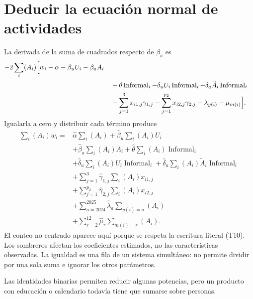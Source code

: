 \documentclass[11pt,a4paper]{article}
\begin{document}
\section{Deducir la ecuación normal de actividades}
La derivada de la suma de cuadrados respecto de $\beta_a$ es
\[
\begin{aligned}-2\sum_i(A_i)\Bigl[w_i-\alpha-\beta_uU_i-\beta_aA_i\\&\quad-\theta\operatorname{Informal}_i-\delta_uU_i\operatorname{Informal}_i-\delta_a\widetilde A_i\operatorname{Informal}_i\\&\quad-\sum_{j=1}^3x_{i1,j}\gamma_{1,j}-\sum_{j=1}^{p_2}x_{i2,j}\gamma_{2,j}-\lambda_{y(i)}-\mu_{m(i)}\Bigr].\end{aligned}
\]
Igualarla a cero y distribuir cada término produce
\[
\begin{aligned}
\sum_i(A_i)w_i={}&\widehat\alpha\sum_i(A_i)
+\widehat\beta_u\sum_i(A_i)U_i\\
&+\widehat\beta_a\sum_i(A_i)A_i
+\widehat\theta\sum_i(A_i)\operatorname{Informal}_i\\
&+\widehat\delta_u\sum_i(A_i)U_i\operatorname{Informal}_i
+\widehat\delta_a\sum_i(A_i)\widetilde A_i\operatorname{Informal}_i\\
&+\sum_{j=1}^3\widehat\gamma_{1,j}\sum_i(A_i)x_{i1,j}\\
&+\sum_{j=1}^{p_2}\widehat\gamma_{2,j}\sum_i(A_i)x_{i2,j}\\
&+\sum_{a=2024}^{2025}\widehat\lambda_a\sum_{y(i)=a}(A_i)\\
&+\sum_{r=2}^{12}\widehat\mu_r\sum_{m(i)=r}(A_i).\end{aligned}
\]
El conteo no centrado aparece aquí porque se respeta la escritura literal (T10).
Los sombreros afectan los coeficientes estimados, no las características observadas. La igualdad es una fila de un sistema simultáneo: no permite dividir por una sola suma e ignorar los otros parámetros.

Las identidades binarias permiten reducir algunas potencias, pero un producto con educación o calendario todavía tiene que sumarse sobre personas.

\clearpage
\end{document}
